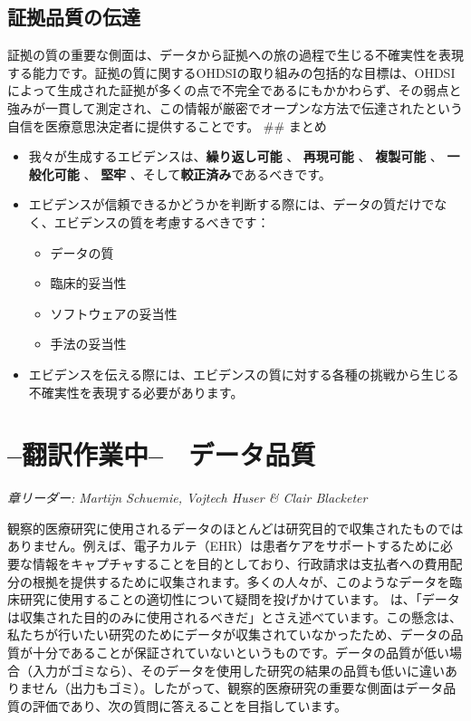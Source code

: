 \documentclass[
  11pt]{book}
\makeatletter
\providecommand{\tightlist}{%
  \setlength{\itemsep}{0pt}\setlength{\parskip}{0pt}}
\newenvironment{kframe}{%
\medskip{}
\setlength{\fboxsep}{.8em}
 \def\at@end@of@kframe{}%
 \ifinner\ifhmode%
  \def\at@end@of@kframe{\end{minipage}}%
  \begin{minipage}{\columnwidth}%
 \fi\fi%
 \def\FrameCommand##1{\hskip\@totalleftmargin \hskip-\fboxsep
 \colorbox{myShadeColor}{##1}\hskip-\fboxsep
     \hskip-\linewidth \hskip-\@totalleftmargin \hskip\columnwidth}%
 \MakeFramed {\advance\hsize-\width
   \@totalleftmargin\z@ \linewidth\hsize
   \@setminipage}}%
 {\par\unskip\endMakeFramed%
 \at@end@of@kframe}
\newenvironment{rmdblock}[1]
  {
  \begin{itemize}
  \renewcommand{\labelitemi}{
    \raisebox{-.7\height}[0pt][0pt]{
      {\setkeys{Gin}{width=3em,keepaspectratio}\texttt{[image: images/\#1]}}
    }
  }
  \setlength{\fboxsep}{1em}
  \begin{kframe}
  \item
  }
  {
  \end{kframe}
  \end{itemize}
  }
\newenvironment{rmdsummary}
  {\begin{rmdblock}{summary}}
  {\end{rmdblock}}
\theoremstyle{definition}
\theoremstyle{definition}
\theoremstyle{definition}
\theoremstyle{definition}
\theoremstyle{remark}
\makeatother
\begin{document}
\section{証拠品質の伝達}\label{ux8a3cux62e0ux54c1ux8ceaux306eux4f1dux9054}

証拠の質の重要な側面は、データから証拠への旅の過程で生じる不確実性を表現する能力です。証拠の質に関するOHDSIの取り組みの包括的な目標は、OHDSIによって生成された証拠が多くの点で不完全であるにもかかわらず、その弱点と強みが一貫して測定され、この情報が厳密でオープンな方法で伝達されたという自信を医療意思決定者に提供することです。
\#\# まとめ

\begin{rmdsummary}
\begin{itemize}
\item
  我々が生成するエビデンスは、\textbf{繰り返し可能} 、 \textbf{再現可能} 、 \textbf{複製可能} 、 \textbf{一般化可能} 、 \textbf{堅牢} 、そして\textbf{較正済み}であるべきです。
\item
  エビデンスが信頼できるかどうかを判断する際には、データの質だけでなく、エビデンスの質を考慮するべきです：

  \begin{itemize}
  \tightlist
  \item
    データの質
  \item
    臨床的妥当性
  \item
    ソフトウェアの妥当性
  \item
    手法の妥当性
  \end{itemize}
\item
  エビデンスを伝える際には、エビデンスの質に対する各種の挑戦から生じる不確実性を表現する必要があります。
\end{itemize}
\end{rmdsummary}

\chapter{--翻訳作業中--　データ品質}\label{DataQuality}

\emph{章リーダー: Martijn Schuemie, Vojtech Huser \& Clair Blacketer}

観察的医療研究に使用されるデータのほとんどは研究目的で収集されたものではありません。例えば、電子カルテ（EHR）は患者ケアをサポートするために必要な情報をキャプチャすることを目的としており、行政請求は支払者への費用配分の根拠を提供するために収集されます。多くの人々が、このようなデータを臨床研究に使用することの適切性について疑問を投げかけています。\citet{vanDerLei_1991} は、「データは収集された目的のみに使用されるべきだ」とさえ述べています。この懸念は、私たちが行いたい研究のためにデータが収集されていなかったため、データの品質が十分であることが保証されていないというものです。データの品質が低い場合（入力がゴミなら）、そのデータを使用した研究の結果の品質も低いに違いありません（出力もゴミ）。したがって、観察的医療研究の重要な側面はデータ品質の評価であり、次の質問に答えることを目指しています。
\end{document}
